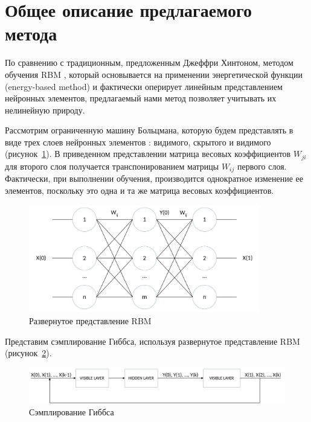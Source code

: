 \section{Общее описание предлагаемого метода}

По сравнению с традиционным, предложенным Джеффри Хинтоном, методом обучения RBM \cite{n1}, который основывается на применении энергетической функции (energy-based method) и фактически оперирует линейным представлением нейронных элементов, предлагаемый нами метод позволяет учитывать их нелинейную природу. 
 
Рассмотрим ограниченную машину Больцмана, которую будем представлять в виде трех слоев нейронных элементов \cite{n10}: видимого, скрытого и видимого (рисунок~\ref{fig:pic2_1}). В приведенном представлении матрица весовых коэффициентов $W_{ji}$ для второго слоя получается транспонированием матрицы $W_{ij}$ первого слоя. Фактически, при выполнении обучения, производится однократное изменение ее элементов, поскольку это одна и та же матрица весовых коэффициентов.

\begin{figure}[H]
  \centering
  \includegraphics[width=0.9\textwidth]{man-source/images/ch2/pic2-1.pdf}
  \caption{Развернутое представление RBM}
  \label{fig:pic2_1}
\end{figure}

Представим сэмплирование Гиббса, используя развернутое представление RBM (рисунок~\ref{fig:pic2_2}).

\begin{figure}[H]
  \centering
  \includegraphics[width=\textwidth]{man-source/images/ch2/pic2-2.pdf}
  \caption{Сэмплирование Гиббса}
  \label{fig:pic2_2}
\end{figure}

